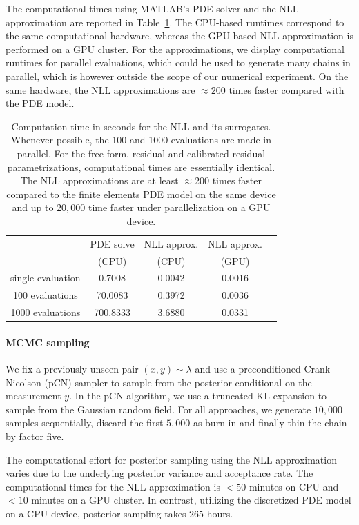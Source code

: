 \documentclass{amsart}
\theoremstyle{definition}
\begin{document}
The computational times using MATLAB's PDE solver and the NLL approximation are reported in Table~\ref{tab: computational times}. 
The CPU-based runtimes correspond to the same computational hardware, whereas the GPU-based NLL approximation is performed on a GPU cluster. For the approximations, we display computational runtimes for parallel evaluations, which could be used to generate many chains in parallel, which is however outside the scope of our numerical experiment. On the same hardware, the NLL approximations are $\approx 200$ times faster compared with the PDE model.
    \begin{table}[h]
        \centering
        \caption{Computation time in seconds for the NLL and its surrogates. Whenever possible, the 100 and 1000 evaluations are made in parallel. For the free-form, residual and calibrated residual parametrizations, computational times are essentially identical. The NLL approximations are at least $\approx 200$ times faster compared to the finite elements PDE model on the same device and up to $20,000$ time faster under parallelization on a GPU device.}
        \begin{tabular}{c|c c c c}
            & PDE solve &NLL approx. &  NLL approx.  \\
            & (CPU)  & (CPU) & (GPU) \\
            \hline
            single evaluation & 0.7008 & 0.0042 &0.0016 \\
            100   evaluations    & 70.0083 &  0.3972& 0.0036\\
            1000  evaluations  &  700.8333& 3.6880&0.0331 
        \end{tabular}
        \label{tab: computational times}
    \end{table}
\paragraph{MCMC sampling}
We fix a previously unseen pair $(x, y) \sim \lambda$ and use a preconditioned Crank-Nicolson (pCN) sampler to sample from the posterior conditional on the measurement $y$. In the pCN algorithm, we use a truncated KL-expansion to sample from the Gaussian random field. For all approaches, we generate $10,000$ samples sequentially, discard the first $5,000$ as burn-in and finally thin the chain by factor five. 

The computational effort for posterior sampling using the NLL approximation varies due to the underlying posterior variance and acceptance rate.  The computational times for the NLL approximation is $< 50$ minutes on CPU and $<10$ minutes on a GPU cluster.
In contrast, utilizing the discretized PDE model on a CPU device, posterior sampling takes $265$ hours.
\end{document}
